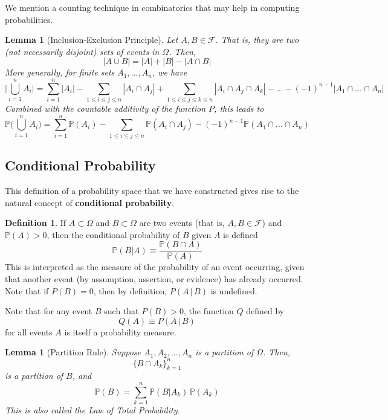 \documentclass{article}
\newtheorem{lemma}[theorem]{Lemma}
\theoremstyle{remark}
\theoremstyle{definition}
\newtheorem{definition}{Definition}[section]
\begin{document}
We mention a counting technique in combinatorics that may help in computing probabilities. 

\begin{lemma}[Inclusion-Exclusion Principle]
Let $A, B \in \mathcal{F}$. That is, they are two (not necessarily disjoint) sets of events in $\Omega$. Then, 
\[|A \cup B| = |A| + |B| - |A \cap B|\]
More generally, for finite sets $A_1, \ldots, A_n$, we have 
\[\bigg| \bigcup_{i=1}^n A_i \bigg| = \sum_{i=1}^n |A_i| - \sum_{1 \leq i \leq j \leq n} |A_i \cap A_j| + \sum_{1 \leq i \leq j \leq k \leq n} |A_i \cap A_j \cap A_k| - \ldots - (-1)^{n-1} |A_1 \cap \ldots \cap A_n |\]
Combined with the countable additivity of the function $P$, this leads to
\[\mathbb{P} \bigg(\bigcup_{i=1}^n A_i \bigg) = \sum_{i=1}^n \mathbb{P}(A_i) - \sum_{1 \leq i \leq j \leq n} \mathbb{P}(A_i \cap A_j) - (-1)^{n-1} \mathbb{P}(A_1 \cap \ldots \cap A_n )\]
\end{lemma}

\subsection{Conditional Probability}
This definition of a probability space that we have constructed gives rise to the natural concept of \textbf{conditional probability}.

\begin{definition}
If $A \subset \Omega$ and $B \subset \Omega$ are two events (that is, $A, B \in \mathcal{F}$) and $\mathbb{P}(A) > 0$, then the conditional probability of $B$ given $A$ is defined  
\[\mathbb{P}(B|A) \equiv \frac{\mathbb{P}(B \cap A)}{\mathbb{P}(A)}\]
This is interpreted as the measure of the probability of an event occurring, given that another event (by assumption, assertion, or evidence) has already occurred. Note that if $P(B) = 0$, then by definition, $P(A\,|\,B)$ is undefined. 
\end{definition}

Note that for any event $B$ such that $P(B) > 0$, the function $Q$ defined by 
\[Q(A) \equiv P(A\,|\,B)\]
for all events $A$ is itself a probability measure. 

\begin{lemma}[Partition Rule]
Suppose $A_1, A_2, ..., A_n$ is a partition of $\Omega$. Then, 
\[\{B \cap A_k\}_{k=1}^n\]
is a partition of $B$, and 
\[\mathbb{P}(B) = \sum_{k=1}^n \mathbb{P} (B|A_k)\, \mathbb{P}(A_k)\]
This is also called the \textit{Law of Total Probability}. 
\end{lemma}
\end{document}

